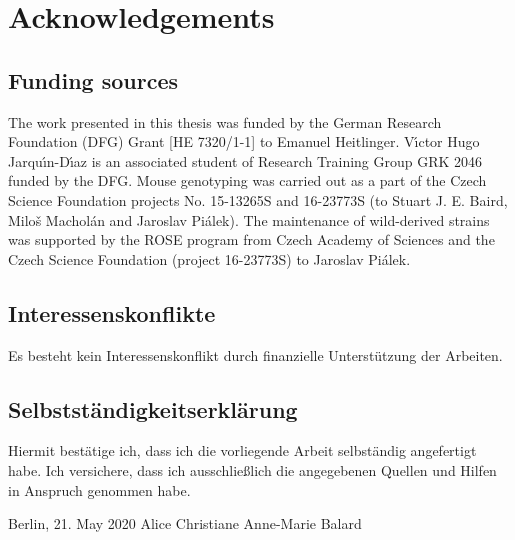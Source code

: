 \documentclass[11pt]{report}
\numberwithin{equation}{section} %
\begin{document}
\chapter*{Acknowledgements}


\newpage

\section*{Funding sources}

The work presented in this thesis was funded by the German Research Foundation (DFG) Grant [HE 7320/1-1] to Emanuel Heitlinger. V{\'{\i}}ctor Hugo Jarqu{\'{\i}}n-D{\'{\i}}az is an associated student of Research Training Group GRK 2046 funded by the DFG. Mouse genotyping was carried out as a part of the Czech Science Foundation projects No. 15-13265S and 16-23773S (to Stuart J. E. Baird, Milo{\v{s}} Machol{\'{a}}n and Jaroslav Pi{\'{a}}lek). The maintenance of wild-derived strains was supported by the ROSE program from Czech Academy of Sciences and the Czech Science Foundation (project 16-23773S) to Jaroslav Pi{\'{a}}lek.

\section*{Interessenskonflikte}

Es besteht kein Interessenskonflikt durch finanzielle Unterstützung der Arbeiten.

\section*{Selbstständigkeitserklärung}

Hiermit bestätige ich, dass ich die vorliegende Arbeit selbständig angefertigt habe. Ich versichere, dass ich ausschließlich die angegebenen Quellen und Hilfen in Anspruch genommen habe.
\par
Berlin, 21. May 2020 \hfill Alice Christiane Anne-Marie Balard
\end{document}

